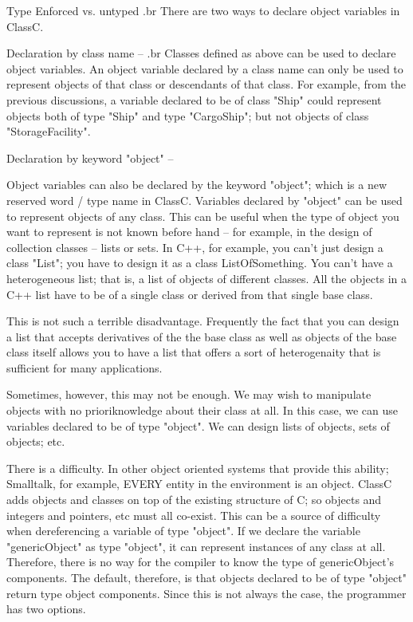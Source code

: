 Type Enforced vs. untyped
.br
There are two ways to declare object variables in ClassC.

Declaration by class name --
.br
Classes defined as above can be used to declare object variables.  An object
variable declared by a class name can only be used to represent objects of
that class or descendants of that class.  For example, from the previous
discussions, a variable declared to be of class "Ship" could represent
objects both of type "Ship" and type "CargoShip"; but not objects of
class "StorageFacility".

Declaration by keyword "object" --

Object variables can also be declared by the keyword "object"; which is a
new reserved word / type name in ClassC.  Variables declared by "object"
can be used to represent objects of any class.  This can be useful
when the type of object you want to represent is not known before hand --
for example, in the design of collection classes -- lists or sets.
In C++, for example, you can't just design a class "List";
you have to design it as a class ListOfSomething.  You can't have a
heterogeneous list; that is, a list of objects of different classes.
All the objects in a C++ list have to be of a single class or derived from
that single base class.  

This is not such a terrible disadvantage.  Frequently the fact that you can
design a list that accepts derivatives of the the base class as well as
objects of the base class itself allows you to have a list that offers a
sort of heterogenaity that is sufficient for many applications.

Sometimes, however, this may not be enough.  We may wish to manipulate
objects with no \fIa priori\fP knowledge about their class at all.
In this case, we can use variables declared to be of type "object".
We can design lists of objects, sets of objects; etc.

There is a difficulty.  In other object oriented systems that provide this
ability; Smalltalk, for example, EVERY entity in the environment is an
object.  ClassC adds objects and classes on top of the existing structure
of C; so objects and integers and pointers, etc must all co-exist.
This can be a source of difficulty when dereferencing a variable of type
"object".
If we declare the variable "genericObject" as type "object",
it can represent instances of any class at all.
Therefore, there is no way for the compiler to know the type of
genericObject's components.  The default, therefore, is that objects
declared to be of type "object" return type object components.  Since this
is not always the case, the programmer has two options.

